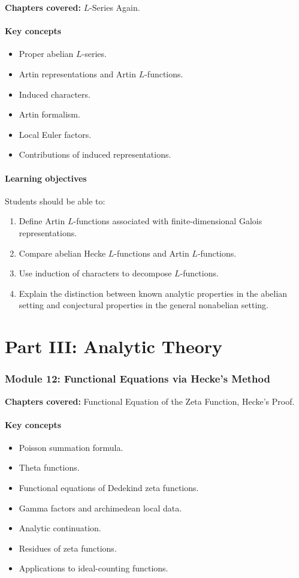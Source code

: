 \documentclass[11pt]{article}
\begin{document}
\textbf{Chapters covered:} $L$-Series Again.

\paragraph{Key concepts}
\begin{itemize}
    \item Proper abelian $L$-series.
    \item Artin representations and Artin $L$-functions.
    \item Induced characters.
    \item Artin formalism.
    \item Local Euler factors.
    \item Contributions of induced representations.
\end{itemize}

\paragraph{Learning objectives}
Students should be able to:
\begin{enumerate}
    \item Define Artin $L$-functions associated with finite-dimensional Galois representations.
    \item Compare abelian Hecke $L$-functions and Artin $L$-functions.
    \item Use induction of characters to decompose $L$-functions.
    \item Explain the distinction between known analytic properties in the abelian setting and conjectural properties in the general nonabelian setting.
\end{enumerate}

\section{Part III: Analytic Theory}

\subsubsection*{Module 12: Functional Equations via Hecke's Method}

\textbf{Chapters covered:} Functional Equation of the Zeta Function, Hecke's Proof.

\paragraph{Key concepts}
\begin{itemize}
    \item Poisson summation formula.
    \item Theta functions.
    \item Functional equations of Dedekind zeta functions.
    \item Gamma factors and archimedean local data.
    \item Analytic continuation.
    \item Residues of zeta functions.
    \item Applications to ideal-counting functions.
\end{itemize}
\end{document}
